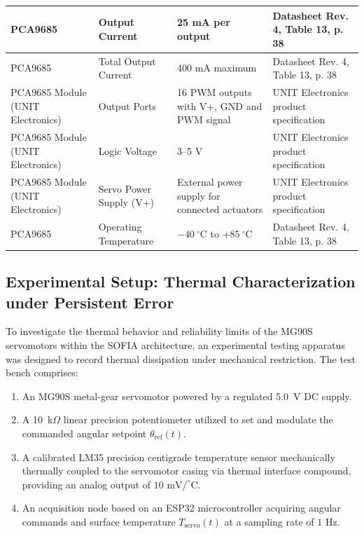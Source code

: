 \documentclass[lettersize,journal]{IEEEtran}
\begin{document}
\begin{table}[ht]
\begin{tabular}{|p{1.4cm}|p{1.8cm}|p{1.8cm}|p{1.8cm}|}
		PCA9685 &
		Output Current &
		25 mA per output &
		Datasheet Rev. 4, Table 13, p. 38 \\
		\hline
		
		PCA9685 &
		Total Output Current &
		400 mA maximum &
		Datasheet Rev. 4, Table 13, p. 38 \\
		\hline
		
		PCA9685 Module (UNIT Electronics) &
		Output Ports &
		16 PWM outputs with V+, GND and PWM signal &
		UNIT Electronics product specification \\
		\hline
		
		PCA9685 Module (UNIT Electronics) &
		Logic Voltage &
		3--5 V &
		UNIT Electronics product specification \\
		\hline
		
		PCA9685 Module (UNIT Electronics) &
		Servo Power Supply (V+) &
		External power supply for connected actuators &
		UNIT Electronics product specification \\
		\hline
		
		PCA9685 &
		Operating Temperature &
		$-40~^\circ\mathrm{C}$ to $+85~^\circ\mathrm{C}$ &
		Datasheet Rev. 4, Table 13, p. 38 \\
		\hline
		
	\end{tabular}
\end{table}

\subsection{Experimental Setup: Thermal Characterization under Persistent Error}
\label{sec:thermal_experiment}

To investigate the thermal behavior and reliability limits of the MG90S servomotors within the SOFIA architecture, an experimental testing apparatus was designed to record thermal dissipation under mechanical restriction. The test bench comprises:
\begin{enumerate}
\item {}An MG90S metal-gear servomotor powered by a regulated 5.0~V DC supply.
\item A 10~k$\Omega$ linear precision potentiometer utilized to set and modulate the commanded angular setpoint $\theta_{\text{ref}}(t)$.
\item {}A calibrated LM35 precision centigrade temperature sensor mechanically thermally coupled to the servomotor casing via thermal interface compound, providing an analog output of $10\text{ mV}/^\circ\text{C}$.
\item {}An acquisition node based on an ESP32 microcontroller acquiring angular commands and surface temperature $T_{\text{servo}}(t)$ at a sampling rate of $1\text{ Hz}$.
\end{enumerate}
\end{document}
